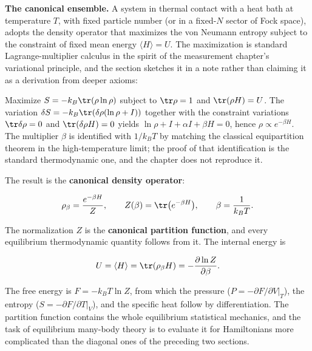 \medskip\noindent\textbf{The canonical ensemble.}
A system in thermal contact with a heat bath at temperature $T$, with fixed particle number (or in a fixed-$N$ sector of Fock space), adopts the density operator that maximizes the von Neumann entropy subject to the constraint of fixed mean energy $\langle H \rangle = U$. The maximization is standard Lagrange-multiplier calculus in the spirit of the measurement chapter's variational principle, and the section sketches it in a note rather than claiming it as a derivation from deeper axioms:
\begin{note}
    Maximize $S = -k_B\tr(\rho\ln\rho)$ subject to $\tr\rho = 1$ and $\tr(\rho H) = U$. The variation $\delta S = -k_B\tr(\delta\rho(\ln\rho + I))$ together with the constraint variations $\tr\delta\rho = 0$ and $\tr(\delta\rho H) = 0$ yields $\ln\rho + I + \alpha I + \beta H = 0$, hence $\rho \propto e^{-\beta H}$. The multiplier $\beta$ is identified with $1/k_B T$ by matching the classical equipartition theorem in the high-temperature limit; the proof of that identification is the standard thermodynamic one, and the chapter does not reproduce it.
\end{note}
The result is the \textbf{canonical density operator}:
\begin{linenomath}
    \begin{equation}
        \rho_\beta = \frac{e^{-\beta H}}{Z},
        \qquad
        Z(\beta) = \tr\bigl(e^{-\beta H}\bigr),
        \qquad
        \beta = \frac{1}{k_B T}.
        \label{eq:canonical-density}
    \end{equation}
\end{linenomath}
The normalization $Z$ is the \textbf{canonical partition function}, and every equilibrium thermodynamic quantity follows from it. The internal energy is
\begin{linenomath}
    \begin{equation}
        U = \langle H \rangle = \tr(\rho_\beta H) = -\frac{\partial\ln Z}{\partial\beta}.
        \label{eq:canonical-energy}
    \end{equation}
\end{linenomath}
The free energy is $F = -k_B T\ln Z$, from which the pressure ($P = -\partial F/\partial V|_T$), the entropy ($S = -\partial F/\partial T|_V$), and the specific heat follow by differentiation. The partition function contains the whole equilibrium statistical mechanics, and the task of equilibrium many-body theory is to evaluate it for Hamiltonians more complicated than the diagonal ones of the preceding two sections.

